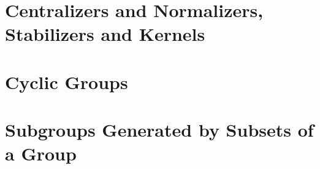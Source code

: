 \documentclass[a4paper, openany]{book}
\begin{document}
\section{Centralizers and Normalizers, Stabilizers and Kernels}

\newpage

\section{Cyclic Groups}

\newpage

\section{Subgroups Generated by Subsets of a Group}

\newpage
\end{document}
